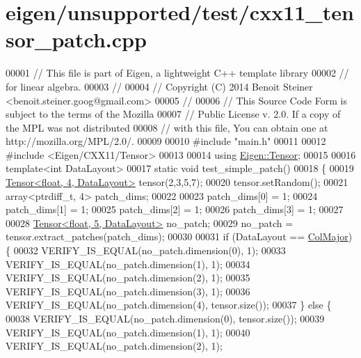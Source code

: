\hypertarget{eigen_2unsupported_2test_2cxx11__tensor__patch_8cpp_source}{}\section{eigen/unsupported/test/cxx11\+\_\+tensor\+\_\+patch.cpp}
\label{eigen_2unsupported_2test_2cxx11__tensor__patch_8cpp_source}

\begin{DoxyCode}
00001 \textcolor{comment}{// This file is part of Eigen, a lightweight C++ template library}
00002 \textcolor{comment}{// for linear algebra.}
00003 \textcolor{comment}{//}
00004 \textcolor{comment}{// Copyright (C) 2014 Benoit Steiner <benoit.steiner.goog@gmail.com>}
00005 \textcolor{comment}{//}
00006 \textcolor{comment}{// This Source Code Form is subject to the terms of the Mozilla}
00007 \textcolor{comment}{// Public License v. 2.0. If a copy of the MPL was not distributed}
00008 \textcolor{comment}{// with this file, You can obtain one at http://mozilla.org/MPL/2.0/.}
00009 
00010 \textcolor{preprocessor}{#include "main.h"}
00011 
00012 \textcolor{preprocessor}{#include <Eigen/CXX11/Tensor>}
00013 
00014 \textcolor{keyword}{using} \hyperlink{class_eigen_1_1_tensor}{Eigen::Tensor};
00015 
00016 \textcolor{keyword}{template}<\textcolor{keywordtype}{int} DataLayout>
00017 \textcolor{keyword}{static} \textcolor{keywordtype}{void} test\_simple\_patch()
00018 \{
00019   \hyperlink{class_eigen_1_1_tensor}{Tensor<float, 4, DataLayout>} tensor(2,3,5,7);
00020   tensor.setRandom();
00021   array<ptrdiff\_t, 4> patch\_dims;
00022 
00023   patch\_dims[0] = 1;
00024   patch\_dims[1] = 1;
00025   patch\_dims[2] = 1;
00026   patch\_dims[3] = 1;
00027 
00028   \hyperlink{class_eigen_1_1_tensor}{Tensor<float, 5, DataLayout>} no\_patch;
00029   no\_patch = tensor.extract\_patches(patch\_dims);
00030 
00031   \textcolor{keywordflow}{if} (DataLayout == \hyperlink{group__enums_ggaacded1a18ae58b0f554751f6cdf9eb13a0cbd4bdd0abcfc0224c5fcb5e4f6669a}{ColMajor}) \{
00032     VERIFY\_IS\_EQUAL(no\_patch.dimension(0), 1);
00033     VERIFY\_IS\_EQUAL(no\_patch.dimension(1), 1);
00034     VERIFY\_IS\_EQUAL(no\_patch.dimension(2), 1);
00035     VERIFY\_IS\_EQUAL(no\_patch.dimension(3), 1);
00036     VERIFY\_IS\_EQUAL(no\_patch.dimension(4), tensor.size());
00037   \} \textcolor{keywordflow}{else} \{
00038     VERIFY\_IS\_EQUAL(no\_patch.dimension(0), tensor.size());
00039     VERIFY\_IS\_EQUAL(no\_patch.dimension(1), 1);
00040     VERIFY\_IS\_EQUAL(no\_patch.dimension(2), 1);

\end{DoxyCode}

